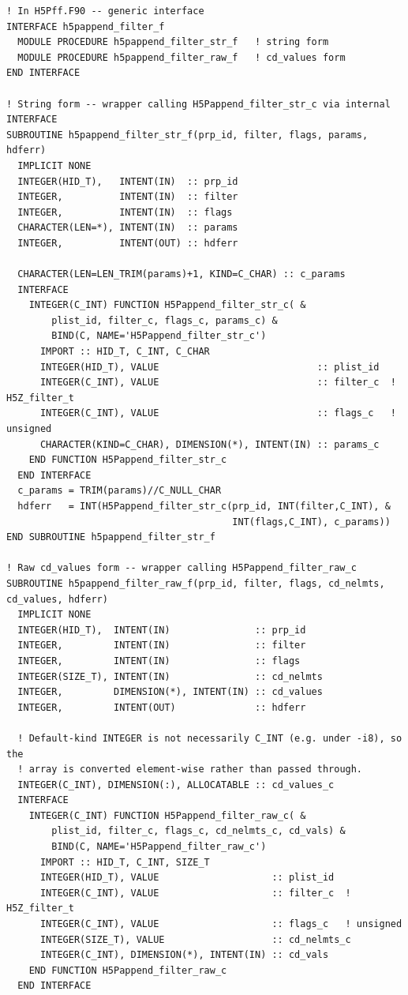\documentclass[../RFC-HDFG-2026-001.tex]{subfiles}
\begin{document}
\begin{verbatim}
! In H5Pff.F90 -- generic interface
INTERFACE h5pappend_filter_f
  MODULE PROCEDURE h5pappend_filter_str_f   ! string form
  MODULE PROCEDURE h5pappend_filter_raw_f   ! cd_values form
END INTERFACE

! String form -- wrapper calling H5Pappend_filter_str_c via internal INTERFACE
SUBROUTINE h5pappend_filter_str_f(prp_id, filter, flags, params, hdferr)
  IMPLICIT NONE
  INTEGER(HID_T),   INTENT(IN)  :: prp_id
  INTEGER,          INTENT(IN)  :: filter
  INTEGER,          INTENT(IN)  :: flags
  CHARACTER(LEN=*), INTENT(IN)  :: params
  INTEGER,          INTENT(OUT) :: hdferr

  CHARACTER(LEN=LEN_TRIM(params)+1, KIND=C_CHAR) :: c_params
  INTERFACE
    INTEGER(C_INT) FUNCTION H5Pappend_filter_str_c( &
        plist_id, filter_c, flags_c, params_c) &
        BIND(C, NAME='H5Pappend_filter_str_c')
      IMPORT :: HID_T, C_INT, C_CHAR
      INTEGER(HID_T), VALUE                            :: plist_id
      INTEGER(C_INT), VALUE                            :: filter_c  ! H5Z_filter_t
      INTEGER(C_INT), VALUE                            :: flags_c   ! unsigned
      CHARACTER(KIND=C_CHAR), DIMENSION(*), INTENT(IN) :: params_c
    END FUNCTION H5Pappend_filter_str_c
  END INTERFACE
  c_params = TRIM(params)//C_NULL_CHAR
  hdferr   = INT(H5Pappend_filter_str_c(prp_id, INT(filter,C_INT), &
                                        INT(flags,C_INT), c_params))
END SUBROUTINE h5pappend_filter_str_f

! Raw cd_values form -- wrapper calling H5Pappend_filter_raw_c
SUBROUTINE h5pappend_filter_raw_f(prp_id, filter, flags, cd_nelmts, cd_values, hdferr)
  IMPLICIT NONE
  INTEGER(HID_T),  INTENT(IN)               :: prp_id
  INTEGER,         INTENT(IN)               :: filter
  INTEGER,         INTENT(IN)               :: flags
  INTEGER(SIZE_T), INTENT(IN)               :: cd_nelmts
  INTEGER,         DIMENSION(*), INTENT(IN) :: cd_values
  INTEGER,         INTENT(OUT)              :: hdferr

  ! Default-kind INTEGER is not necessarily C_INT (e.g. under -i8), so the
  ! array is converted element-wise rather than passed through.
  INTEGER(C_INT), DIMENSION(:), ALLOCATABLE :: cd_values_c
  INTERFACE
    INTEGER(C_INT) FUNCTION H5Pappend_filter_raw_c( &
        plist_id, filter_c, flags_c, cd_nelmts_c, cd_vals) &
        BIND(C, NAME='H5Pappend_filter_raw_c')
      IMPORT :: HID_T, C_INT, SIZE_T
      INTEGER(HID_T), VALUE                    :: plist_id
      INTEGER(C_INT), VALUE                    :: filter_c  ! H5Z_filter_t
      INTEGER(C_INT), VALUE                    :: flags_c   ! unsigned
      INTEGER(SIZE_T), VALUE                   :: cd_nelmts_c
      INTEGER(C_INT), DIMENSION(*), INTENT(IN) :: cd_vals
    END FUNCTION H5Pappend_filter_raw_c
  END INTERFACE


\end{verbatim}
\end{document}
